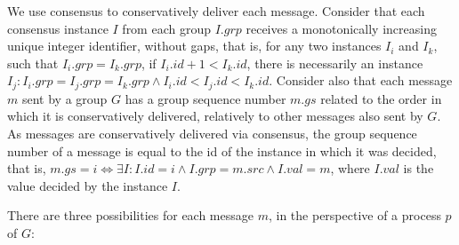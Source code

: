 \documentclass[times, 10pt]{article}
\begin{document}
We use consensus to conservatively deliver each message. Consider that each consensus instance $I$ from each group $I.grp$ receives a monotonically increasing unique integer identifier, without gaps, that is, for any two instances $I_i$ and $I_k$, such that $I_i.grp = I_k.grp$, if $I_i.id + 1 < I_k.id$, there is necessarily an instance $I_j : I_i.grp = I_j.grp = I_k.grp \wedge I_i.id < I_j.id < I_k.id$. Consider also that each message $m$ sent by a group $G$ has a group sequence number $m.gs$ related to the order in which it is conservatively delivered, relatively to other messages also sent by $G$. As messages are conservatively delivered via consensus, the group sequence number of a message is equal to the id of the instance in which it was decided, that is, $m.gs = i \Leftrightarrow \exists I : I.id = i \wedge I.grp = m.src \wedge I.val = m$, where $I.val$ is the value decided by the instance $I$.

There are three possibilities for each message $m$, in the perspective of a process $p$ of $G$:
\end{document}
